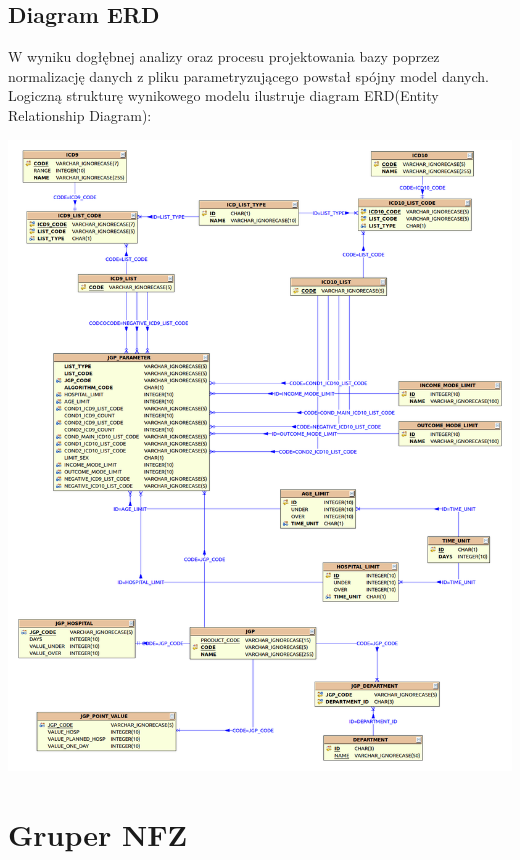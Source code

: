\newpage
\subsection{Diagram ERD}
\label{sec:diagramERD}

W wyniku dogłębnej analizy oraz procesu projektowania bazy poprzez normalizację danych z pliku parametryzującego powstał spójny model danych. Logiczną strukturę wynikowego modelu ilustruje diagram ERD(Entity Relationship Diagram):

\includegraphics[scale=0.31]{images/erd}

\section{Gruper NFZ}
\label{sec:gruperNFZ}

